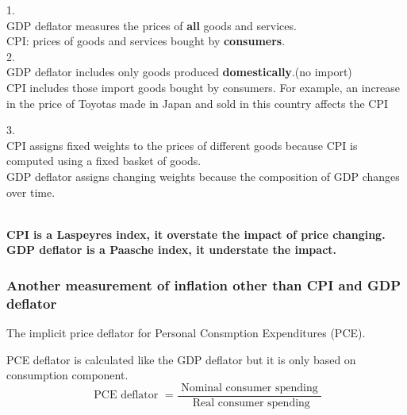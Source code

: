 \documentclass[12pt]{article}
\begin{document}
1.\\
GDP deflator measures the prices of {\textbf {all}} goods and services. \\
CPI: prices of goods and services bought by {\textbf {consumers}}.\\


2.\\
GDP deflator includes only goods produced {\textbf {domestically}}.(no import)\\
CPI includes those import goods bought by consumers.
For example, an increase in the price of Toyotas made in Japan and sold in this 
country affects the CPI


3.\\
CPI assigns fixed weights to the prices of different goods because CPI is computed using
a fixed basket of goods.\\
GDP deflator assigns changing weights because the composition of GDP changes over time.


\noindent{}\\

{\textbf {CPI is a Laspeyres index, it overstate the impact of price changing.}}\\
{\textbf {GDP deflator is a Paasche index, it understate the impact.}}


\subsubsection{Another measurement of inflation other than CPI and GDP deflator}
The implicit price deflator for Personal Consmption Expenditures (PCE).

PCE deflator is calculated like the GDP deflator but it is only based on consumption
component.
\begin{equation*}
\text{ PCE deflator } = \frac{\text{ Nominal consumer spending }}{\text{ Real 
consumer spending}}
\end{equation*}
\end{document}
